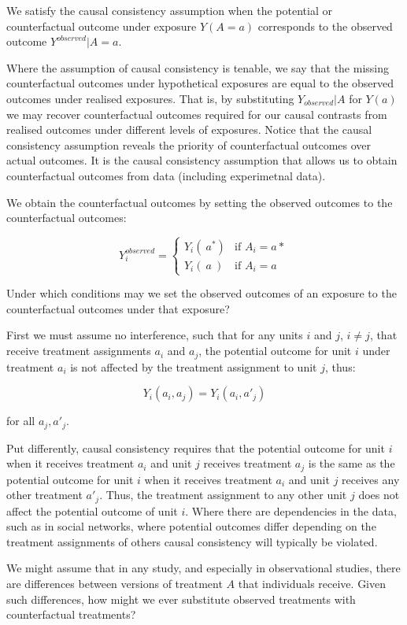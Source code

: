 \documentclass[
  singlecolumn]{report}
\begin{document}
We satisfy the causal consistency assumption when the potential or
counterfactual outcome under exposure \(Y(A=a)\) corresponds to the
observed outcome \(Y^{observed}|A=a\).

Where the assumption of causal consistency is tenable, we say that the
missing counterfactual outcomes under hypothetical exposures are equal
to the observed outcomes under realised exposures. That is, by
substituting \(Y_{observed}|A\) for \(Y(a)\) we may recover
counterfactual outcomes required for our causal contrasts from realised
outcomes under different levels of exposures. Notice that the causal
consistency assumption reveals the priority of counterfactual outcomes
over actual outcomes. It is the causal consistency assumption that
allows us to obtain counterfactual outcomes from data (including
experimetnal data).

We obtain the counterfactual outcomes by setting the observed outcomes
to the counterfactual outcomes:

\[
Y^{observed}_i = 
\begin{cases} 
Y_i(~a^*) & \text{if } A_i = a* \\
Y_i(~a~) & \text{if } A_i = a
\end{cases}
\]

Under which conditions may we set the observed outcomes of an exposure
to the counterfactual outcomes under that exposure?

First we must assume no interference, such that for any units \(i\) and
\(j\), \(i \neq j\), that receive treatment assignments \(a_i\) and
\(a_j\), the potential outcome for unit \(i\) under treatment \(a_i\) is
not affected by the treatment assignment to unit \(j\), thus:

\[Y_i(a_i, a_j) = Y_i(a_i, a'_j)\]

for all \(a_j, a'_j\).

Put differently, causal consistency requires that the potential outcome
for unit \(i\) when it receives treatment \(a_i\) and unit \(j\)
receives treatment \(a_j\) is the same as the potential outcome for unit
\(i\) when it receives treatment \(a_i\) and unit \(j\) receives any
other treatment \(a'_j\). Thus, the treatment assignment to any other
unit \(j\) does not affect the potential outcome of unit \(i\). Where
there are dependencies in the data, such as in social networks, where
potential outcomes differ depending on the treatment assignments of
others causal consistency will typically be violated.

We might assume that in any study, and especially in observational
studies, there are differences between versions of treatment \(A\) that
individuals receive. Given such differences, how might we ever
substitute observed treatments with counterfactual treatments?
\end{document}
